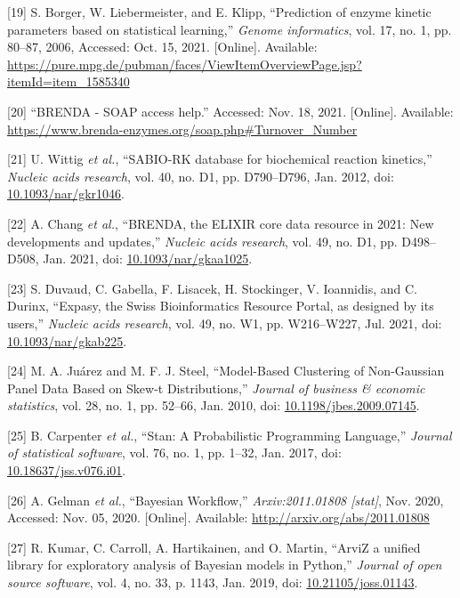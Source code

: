 \documentclass[11pt]{article}
\begin{document}
\hypertarget{citeproc_bib_item_19}{[19] S. Borger, W. Liebermeister, and E. Klipp, “Prediction of enzyme kinetic parameters based on statistical learning,” \textit{Genome informatics}, vol. 17, no. 1, pp. 80–87, 2006, Accessed: Oct. 15, 2021. [Online]. Available: \url{https://pure.mpg.de/pubman/faces/ViewItemOverviewPage.jsp?itemId=item_1585340}}

\hypertarget{citeproc_bib_item_20}{[20] “BRENDA - SOAP access help.” Accessed: Nov. 18, 2021. [Online]. Available: \url{https://www.brenda-enzymes.org/soap.php#Turnover_Number}}

\hypertarget{citeproc_bib_item_21}{[21] U. Wittig \textit{et al.}, “SABIO-RK database for biochemical reaction kinetics,” \textit{Nucleic acids research}, vol. 40, no. D1, pp. D790–D796, Jan. 2012, doi: \href{https://doi.org/10.1093/nar/gkr1046}{10.1093/nar/gkr1046}.}

\hypertarget{citeproc_bib_item_22}{[22] A. Chang \textit{et al.}, “BRENDA, the ELIXIR core data resource in 2021: New developments and updates,” \textit{Nucleic acids research}, vol. 49, no. D1, pp. D498–D508, Jan. 2021, doi: \href{https://doi.org/10.1093/nar/gkaa1025}{10.1093/nar/gkaa1025}.}

\hypertarget{citeproc_bib_item_23}{[23] S. Duvaud, C. Gabella, F. Lisacek, H. Stockinger, V. Ioannidis, and C. Durinx, “Expasy, the Swiss Bioinformatics Resource Portal, as designed by its users,” \textit{Nucleic acids research}, vol. 49, no. W1, pp. W216–W227, Jul. 2021, doi: \href{https://doi.org/10.1093/nar/gkab225}{10.1093/nar/gkab225}.}

\hypertarget{citeproc_bib_item_24}{[24] M. A. Juárez and M. F. J. Steel, “Model-Based Clustering of Non-Gaussian Panel Data Based on Skew-t Distributions,” \textit{Journal of business \& economic statistics}, vol. 28, no. 1, pp. 52–66, Jan. 2010, doi: \href{https://doi.org/10.1198/jbes.2009.07145}{10.1198/jbes.2009.07145}.}

\hypertarget{citeproc_bib_item_25}{[25] B. Carpenter \textit{et al.}, “Stan: A Probabilistic Programming Language,” \textit{Journal of statistical software}, vol. 76, no. 1, pp. 1–32, Jan. 2017, doi: \href{https://doi.org/10.18637/jss.v076.i01}{10.18637/jss.v076.i01}.}

\hypertarget{citeproc_bib_item_26}{[26] A. Gelman \textit{et al.}, “Bayesian Workflow,” \textit{Arxiv:2011.01808 [stat]}, Nov. 2020, Accessed: Nov. 05, 2020. [Online]. Available: \url{http://arxiv.org/abs/2011.01808}}

\hypertarget{citeproc_bib_item_27}{[27] R. Kumar, C. Carroll, A. Hartikainen, and O. Martin, “ArviZ a unified library for exploratory analysis of Bayesian models in Python,” \textit{Journal of open source software}, vol. 4, no. 33, p. 1143, Jan. 2019, doi: \href{https://doi.org/10.21105/joss.01143}{10.21105/joss.01143}.}
\end{document}
